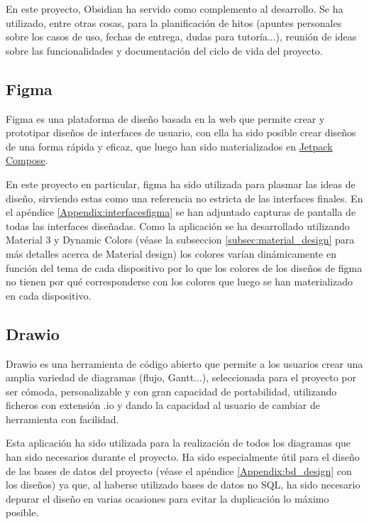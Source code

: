 En este proyecto, Obsidian ha servido como complemento al desarrollo. Se ha utilizado, entre otras cosas, para la planificación de hitos (apuntes personales sobre los casos de uso, fechas de entrega, dudas para tutoría...), reunión de ideas sobre las funcionalidades y documentación del ciclo de vida del proyecto.

\hypertarget{subsec:figma}{}
\subsection{Figma}
Figma\hyperlink{cap:biblio}{} es una plataforma de diseño basada en la web que permite crear y prototipar diseños de interfaces de usuario, con ella ha sido posible crear diseños de una forma rápida y eficaz, que luego han sido materializados en \hyperlink{subsec:compose}{Jetpack Compose}. 

En este proyecto en particular, figma ha sido utilizada para plasmar las ideas de diseño, sirviendo estas como una referencia no estricta de las interfaces finales. En el apéndice \ref{Appendix:interfacesfigma} se han adjuntado capturas de pantalla de todas las interfaces diseñadas. Como la aplicación se ha desarrollado utilizando 
Material 3\hyperlink{cap:biblio}{} y Dynamic Colors (véase la subseccion \ref{subsec:material_design} para más detalles acerca de Material design) los colores varían dinámicamente en función del tema de cada dispositivo por lo que los colores de los diseños de figma no tienen por qué corresponderse con los colores que luego se han materializado en cada dispositivo.
\hypertarget{subsec:drawio}{}
\subsection{Drawio}
Drawio\hyperlink{cap:biblio}{} es una herramienta de código abierto que permite a los usuarios crear una amplia variedad de diagramas (flujo, Gantt...), seleccionada para el proyecto por ser cómoda, personalizable y con gran capacidad de portabilidad, utilizando ficheros con extensión .io y dando la capacidad al usuario de cambiar de herramienta con facilidad. 

Esta aplicación ha sido utilizada para la realización de todos los diagramas que han sido necesarios durante el proyecto. Ha sido especialmente útil para el diseño de las bases de datos del proyecto (véase el apéndice \ref{Appendix:bd_design} con los diseños) ya que, al haberse utilizado bases de datos no SQL, ha sido necesario depurar el diseño en varias ocasiones para evitar la duplicación lo máximo posible.

